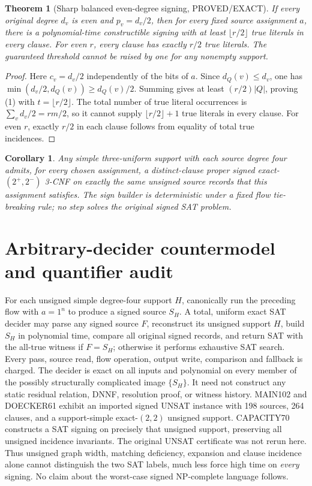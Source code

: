 \documentclass[11pt]{article}
\newtheorem{theorem}{Theorem}
\newtheorem{corollary}{Corollary}
\begin{document}
\begin{theorem}[Sharp balanced even-degree signing, PROVED/EXACT]
If every original degree $d_v$ is even and $p_v=d_v/2$, then for \emph{every} fixed source assignment $a$, there is a polynomial-time constructible signing with at least $\lfloor r/2\rfloor$ true literals in \emph{every} clause. For even $r$, every clause has exactly $r/2$ true literals. The guaranteed threshold cannot be raised by one for any nonempty support.
\end{theorem}
\begin{proof}
Here $c_v=d_v/2$ independently of the bits of $a$. Since $d_Q(v)\le d_v$, one has $\min(d_v/2,d_Q(v))\ge d_Q(v)/2$. Summing gives at least $(r/2)|Q|$, proving (1) with $t=\lfloor r/2\rfloor$. The total number of true literal occurrences is $\sum_vd_v/2=rm/2$, so it cannot supply $\lfloor r/2\rfloor+1$ true literals in every clause. For even $r$, exactly $r/2$ in each clause follows from equality of total true incidences.
\end{proof}
\begin{corollary}
Any simple three-uniform support with each source degree four admits, for \emph{every} chosen assignment, a distinct-clause proper signed exact-$(2^+,2^-)$ 3-CNF on exactly the same unsigned source records that this assignment satisfies. The sign builder is deterministic under a fixed flow tie-breaking rule; no step solves the original signed SAT problem.
\end{corollary}
\section{Arbitrary-decider countermodel and quantifier audit}
For each unsigned simple degree-four support $H$, canonically run the preceding flow with $a=1^n$ to produce a signed source $S_H$. A total, uniform exact SAT decider may parse any signed source $F$, reconstruct its unsigned support $H$, build $S_H$ in polynomial time, compare all original signed records, and return SAT with the all-true witness if $F=S_H$; otherwise it performs exhaustive SAT search. Every pass, source read, flow operation, output write, comparison and fallback is charged. The decider is exact on all inputs and polynomial on every member of the possibly structurally complicated image $\{S_H\}$. It need not construct any static residual relation, DNNF, resolution proof, or witness history.
MAIN102 and DOECKER61 exhibit an imported signed UNSAT instance with 198 sources, 264 clauses, and a support-simple exact-$(2,2)$ unsigned support. CAPACITY70 constructs a SAT signing on precisely that unsigned support, preserving all unsigned incidence invariants. The original UNSAT certificate was not rerun here. Thus unsigned graph width, matching deficiency, expansion and clause incidence alone cannot distinguish the two SAT labels, much less force high time on \emph{every} signing. No claim about the worst-case signed NP-complete language follows.
\end{document}
